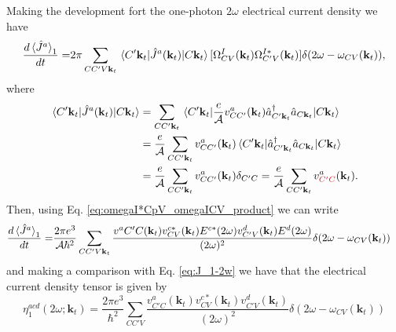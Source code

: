 \documentclass{article}
\newcommand{\kt}{\mathbf{k}_{t}}
\begin{document}
Making the development fort the one-photon $2\omega$ electrical current density
we have
\begin{equation*}
\begin{split}
\frac{d \ev*{\hat{J}^{a}}_{1}}{dt} =& 2\pi \sum_{CC'V\kt} \mel*{C'\kt}
{\hat{J}^{a}(\kt)}{C\kt} [\Omega^{I}_{CV}(\kt) \Omega^{I*}_{C'V}(\kt)] 
\delta(2\omega - \omega_{CV}(\kt)) , \\
\end{split}
\end{equation*}
where
\begin{equation}\label{eq:J-matelem}
\begin{split}
\mel*{C'\kt}{\hat{J}^{a}(\kt)}{C\kt} &= 
\sum_{CC'\kt} \mel*{C'\kt}
{\frac{e}{\mathcal{A}} v^{a}_{CC'}(\kt) \hat{a}^{\dag}_{C'\kt} \hat{a}_{C\kt}}
{C\kt} \\
&= \frac{e}{\mathcal{A}} \sum_{CC'\kt} v^{a}_{CC'}(\kt) \mel*{C'\kt} 
{\hat{a}^{\dag}_{C'\kt} \hat{a}_{C\kt}}
{C\kt} \\
&= \frac{e}{\mathcal{A}} \sum_{CC'\kt}
v^{a}_{CC'}(\kt) \delta_{C'C} = \frac{e}{\mathcal{A}} \sum_{CC'\kt}
v^{a}_{{\color{red}{C'C}}}(\kt) .
\end{split}
\end{equation}
Then, using Eq. \eqref{eq:omegaI*CpV_omegaICV_product} we can write
\begin{equation}
\begin{split}
\frac{d\ev*{\hat{J}^{a}}_{1}}{dt} =& \frac{2 \pi e^{3}}{\mathcal{A} \hbar^{2}}
\sum_{CC'V\kt} \frac{v^{a}{C'C}(\kt) v^{c*}_{CV}(\kt) E^{c*}(2\omega) 
v^{d}_{C'V}(\kt) E^{d}(2\omega)}{(2\omega)^{2}} \delta(2\omega - 
\omega_{CV}(\kt))
\end{split}
\end{equation}
and making a comparison with Eq. \eqref{eq:J_1-2w} we have that the electrical 
current density tensor is given by
\begin{equation}
\eta^{acd}_1(2\omega;\kt) = \frac{2 \pi e^{3}}{\hbar^{2}} \sum_{CC'V}
\frac{v^{a}_{C'C}(\kt) v^{c*}_{CV}(\kt) v^{d}_{C'V}(\kt) }{(2\omega)^{2}}
\delta(2\omega - \omega_{CV}(\kt))
\end{equation}
\end{document}
